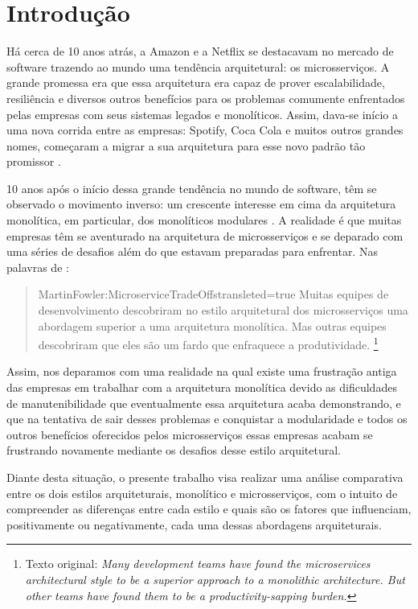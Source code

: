 \chapter[Introdução]{Introdução}

Há cerca de 10 anos atrás, a Amazon e a Netflix se destacavam no mercado de software trazendo ao
mundo uma tendência arquitetural: os microsserviços. A grande promessa era que essa
arquitetura era capaz de prover escalabilidade, resiliência e diversos outros benefícios para os
problemas comumente enfrentados pelas empresas com seus sistemas legados e monolíticos. Assim,
dava-se início a uma nova corrida entre as empresas: Spotify, Coca Cola e muitos outros
grandes nomes, começaram a migrar a sua arquitetura para esse novo padrão tão promissor
\cite{Aleksandra2019}.

10 anos após o início dessa grande tendência no mundo de software, têm se observado o movimento
inverso: um crescente interesse em cima da arquitetura monolítica, em particular, dos monolíticos
modulares \cite{QTrends}. A realidade é que muitas empresas têm se aventurado na arquitetura de
microsserviços e se deparado com uma séries de desafios além do que estavam preparadas para
enfrentar. Nas palavras de :

\begin{quotation}{MartinFowler:MicroserviceTradeOffs}{transleted=true}
    Muitas equipes de desenvolvimento descobriram no estilo arquitetural dos microsserviços uma
    abordagem superior a uma arquitetura monolítica. Mas outras equipes descobriram que eles
    são um fardo que enfraquece a produtividade. \footnote{Texto original: \textit{Many
    development teams have found the microservices architectural style to be a superior approach
    to a monolithic architecture. But other teams have found them to be a productivity-sapping
    burden.}}
\end{quotation}

Assim, nos deparamos com uma realidade na qual existe uma frustração antiga das empresas em trabalhar
com a arquitetura monolítica devido as dificuldades de manutenibilidade que eventualmente essa arquitetura
acaba demonstrando, e que na tentativa de sair desses problemas e conquistar a modularidade e todos os outros
benefícios oferecidos pelos microsserviços essas empresas acabam se frustrando novamente mediante os desafios
desse estilo arquitetural.

Diante desta situação, o presente trabalho visa realizar uma análise comparativa entre os dois estilos
arquiteturais, monolítico e microsserviços, com o intuito de compreender as diferenças entre cada estilo
e quais são os fatores que influenciam, positivamente ou negativamente, cada uma dessas abordagens
arquiteturais.

